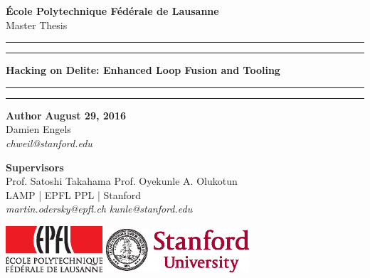 
\begin{titlepage}
\begin{center}
\Large
\textbf{École Polytechnique Fédérale de Lausanne} \\
\vspace{1cm}
Master Thesis
\vspace{2cm}
\hrule
\vspace{0.1cm}
\hrule
\vspace{1cm}
\Huge
\textbf{Hacking on Delite: Enhanced Loop Fusion and Tooling} \\
\vspace{1cm}
\hrule
\vspace{0.1cm}
\hrule
\end{center}
\vfill
\noindent \textbf{Author} \hfill \textbf{August 29, 2016} \\
Damien Engels \\
\textit{chweil@stanford.edu} \\
\vspace{0.5cm}

\noindent \textbf{Supervisors} \\
Prof. Satoshi Takahama            \hfill    Prof. Oyekunle A. Olukotun \\
LAMP | EPFL                     \hfill    PPL | Stanford \\
\textit{martin.odersky@epfl.ch} \hfill    \textit{kunle@stanford.edu} \\
\vspace{0.8cm}

\noindent
\includegraphics[width=0.27\textwidth]{images/epfl-logo.eps}
\hfill
\includegraphics[width=0.4\textwidth]{images/stanford-logo.eps}

\end{titlepage}

\newpage
\null
\thispagestyle{empty}
\newpage
